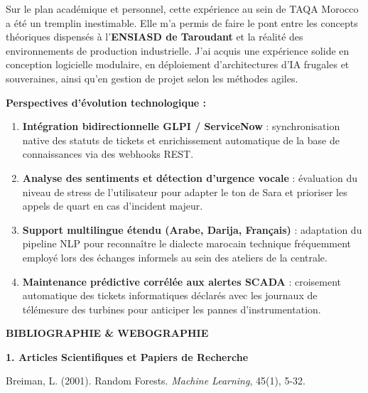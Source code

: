 \documentclass[12pt, a4paper, oneside]{report}
\begin{document}
Sur le plan académique et personnel, cette expérience au sein de TAQA Morocco a été un tremplin inestimable. Elle m'a permis de faire le pont entre les concepts théoriques dispensés à l'\textbf{ENSIASD de Taroudant} et la réalité des environnements de production industrielle. J'ai acquis une expérience solide en conception logicielle modulaire, en déploiement d'architectures d'IA frugales et souveraines, ainsi qu'en gestion de projet selon les méthodes agiles.

\vspace{0.6cm}

\noindent\textbf{Perspectives d'évolution technologique :}
\begin{enumerate}
  \item \textbf{Intégration bidirectionnelle GLPI / ServiceNow} : synchronisation native des statuts de tickets et enrichissement automatique de la base de connaissances via des webhooks REST.
  \item \textbf{Analyse des sentiments et détection d'urgence vocale} : évaluation du niveau de stress de l'utilisateur pour adapter le ton de Sara et prioriser les appels de quart en cas d'incident majeur.
  \item \textbf{Support multilingue étendu (Arabe, Darija, Français)} : adaptation du pipeline NLP pour reconnaître le dialecte marocain technique fréquemment employé lors des échanges informels au sein des ateliers de la centrale.
  \item \textbf{Maintenance prédictive corrélée aux alertes SCADA} : croisement automatique des tickets informatiques déclarés avec les journaux de télémesure des turbines pour anticiper les pannes d'instrumentation.
\end{enumerate}

\newpage
{}
\begin{flushright}
  \textbf{\Large BIBLIOGRAPHIE \& WEBOGRAPHIE}
\end{flushright}

\vspace{0.8cm}

\noindent\textbf{\large 1. Articles Scientifiques et Papiers de Recherche}

\vspace{0.4cm}

\noindent [1] Breiman, L. (2001). Random Forests. \textit{Machine Learning}, 45(1), 5-32.
\end{document}

